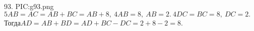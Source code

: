 93. {{PIC:g93.png}}\\
$5AB=AC=AB+BC=AB+8,\ 4AB=8,\ AB=2.\ 4DC=BC=8,\ DC=2.$ Тогда$AD=AB+BD=AD+BC-DC=2+8-2=8.$\\
